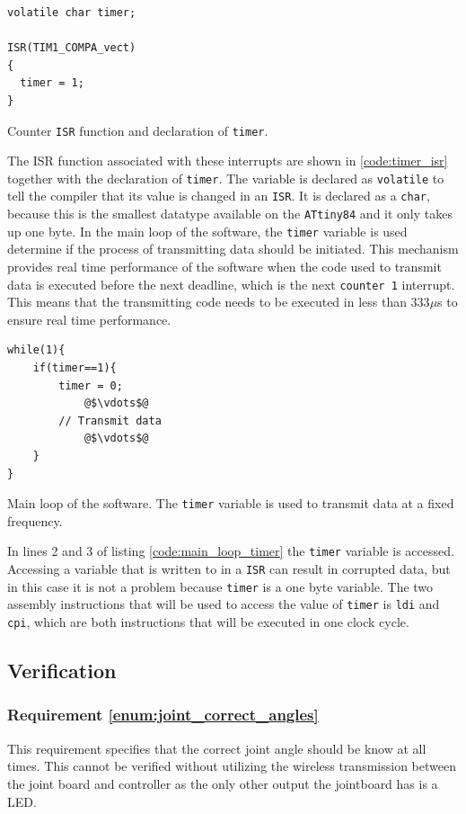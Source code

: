 {\begin{listing}[h] 
\begin{verbatim}
volatile char timer;

ISR(TIM1_COMPA_vect)
{ 
  timer = 1;
}
\end{verbatim}
\caption{Counter \texttt{ISR} function and declaration of \texttt{timer}.}
\label{code:timer_isr}
\end{listing}

The ISR function associated with these interrupts are shown in \ref{code:timer_isr} together with the declaration of \texttt{timer}.
The variable is declared as \texttt{volatile} to tell the compiler that its value is changed in an \texttt{ISR}. 
It is declared as a \texttt{char}, because this is the smallest datatype available on the \texttt{ATtiny84} and it only takes up one byte. 
In the main loop of the software, the \texttt{timer} variable is used determine if the process of transmitting data should be initiated.
This mechanism provides real time performance of the software when the code used to transmit data is executed before the next deadline, which is the next \texttt{counter 1} interrupt.
This means that the transmitting code needs to be executed in less than 333$\mu$s to ensure real time performance.

\begin{listing}[h] 
\begin{verbatim}
while(1){
    if(timer==1){ 
      	timer = 0;
      		@$\vdots$@
      	// Transmit data
			@$\vdots$@      
	}
}
\end{verbatim}
\caption{Main loop of the software. The \texttt{timer} variable is used to transmit data at a fixed frequency.} 
\label{code:main_loop_timer}
\end{listing}
In lines 2 and 3 of listing \ref{code:main_loop_timer} the \texttt{timer} variable is accessed.  
Accessing a variable that is written to in a \texttt{ISR} can result in corrupted data, but in this case it is not a problem because \texttt{timer} is a one byte variable. 
The two assembly instructions that will be used to access the value of \texttt{timer} is \texttt{ldi} and \texttt{cpi}, which are both instructions that will be executed in one clock cycle.

\subsection{Verification} %
\label{sub:verification}


\subsubsection{Requirement \ref{enum:joint_correct_angles}} %
\label{ssub:requirement_enum:correct_angles}
This requirement specifies that the correct joint angle should be know at all times.
This cannot be verified without utilizing the wireless transmission between the joint board and controller as the only other output the jointboard has is a LED.

}
